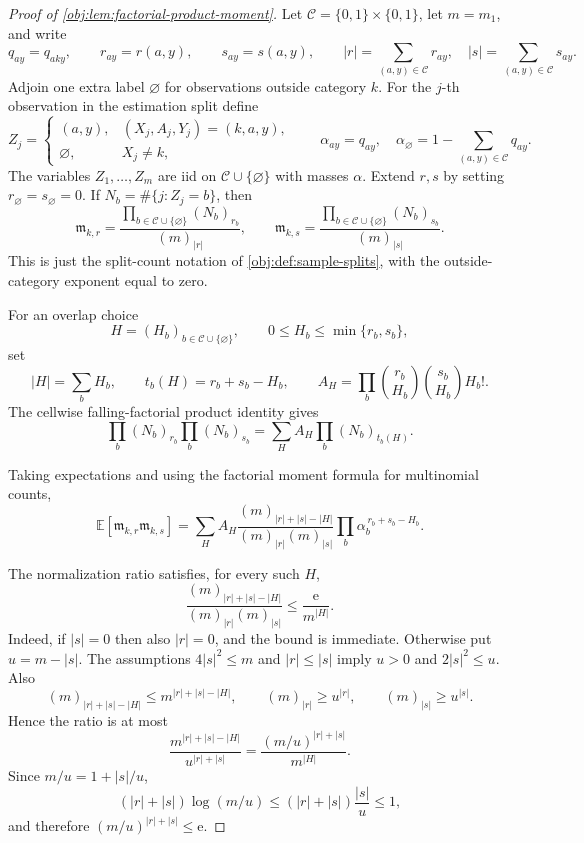 \begin{proof}[Proof of \cref{obj:lem:factorial-product-moment}]
Let \(\mathcal C=\{0,1\}\times\{0,1\}\), let \(m=m_1\), and write
\[
q_{ay}=q_{aky},\qquad r_{ay}=r(a,y),\qquad s_{ay}=s(a,y),
\qquad |r|=\sum_{(a,y)\in\mathcal C}r_{ay},\quad |s|=\sum_{(a,y)\in\mathcal C}s_{ay}.
\]
Adjoin one extra label \(\varnothing\) for observations outside category \(k\).  For the \(j\)-th observation in the estimation split define
\[
Z_j=
\begin{cases}
(a,y),& (X_j,A_j,Y_j)=(k,a,y),\\
\varnothing,& X_j\ne k,
\end{cases}
\qquad
\alpha_{ay}=q_{ay},\quad
\alpha_{\varnothing}=1-\sum_{(a,y)\in\mathcal C}q_{ay}.
\]
The variables \(Z_1,\ldots,Z_m\) are iid on \(\mathcal C\cup\{\varnothing\}\) with masses \(\alpha\).  Extend \(r,s\) by setting \(r_{\varnothing}=s_{\varnothing}=0\).  If \(N_b=\#\{j:Z_j=b\}\), then
\[
\mathfrak m_{k,r}
=
\frac{\prod_{b\in\mathcal C\cup\{\varnothing\}}(N_b)_{r_b}}{(m)_{|r|}},
\qquad
\mathfrak m_{k,s}
=
\frac{\prod_{b\in\mathcal C\cup\{\varnothing\}}(N_b)_{s_b}}{(m)_{|s|}} .
\]
This is just the split-count notation of \cref{obj:def:sample-splits}, with the outside-category exponent equal to zero. %

For an overlap choice
\[
H=(H_b)_{b\in\mathcal C\cup\{\varnothing\}},
\qquad
0\le H_b\le \min\{r_b,s_b\},
\]
set
\[
|H|=\sum_b H_b,\qquad
t_b(H)=r_b+s_b-H_b,\qquad
A_H=\prod_b {r_b\choose H_b}{s_b\choose H_b}H_b! .
\]
The cellwise falling-factorial product identity gives
\[
\prod_b (N_b)_{r_b}\prod_b (N_b)_{s_b}
=
\sum_H
A_H\prod_b (N_b)_{t_b(H)} .
\]

Taking expectations and using the factorial moment formula for multinomial counts,
\[
\mathbb E\!\left[
\mathfrak m_{k,r}\mathfrak m_{k,s}
\right]
=
\sum_H
A_H
\frac{(m)_{|r|+|s|-|H|}}{(m)_{|r|}(m)_{|s|}}
\prod_b \alpha_b^{\,r_b+s_b-H_b}.
\]

The normalization ratio satisfies, for every such \(H\),
\[
\frac{(m)_{|r|+|s|-|H|}}{(m)_{|r|}(m)_{|s|}}
\le
\frac{\mathrm e}{m^{|H|}} .
\]
Indeed, if \(|s|=0\) then also \(|r|=0\), and the bound is immediate.  Otherwise put \(u=m-|s|\).  The assumptions \(4|s|^2\le m\) and \(|r|\le |s|\) imply \(u>0\) and \(2|s|^2\le u\).  Also
\[
(m)_{|r|+|s|-|H|}\le m^{|r|+|s|-|H|},\qquad
(m)_{|r|}\ge u^{|r|},\qquad
(m)_{|s|}\ge u^{|s|}.
\]
Hence the ratio is at most
\[
\frac{m^{|r|+|s|-|H|}}{u^{|r|+|s|}}
=
\frac{(m/u)^{|r|+|s|}}{m^{|H|}} .
\]
Since \(m/u=1+|s|/u\),
\[
(|r|+|s|)\log(m/u)
\le
(|r|+|s|)\frac{|s|}{u}
\le 1,
\]
and therefore \((m/u)^{|r|+|s|}\le \mathrm e\). %


\end{proof}
